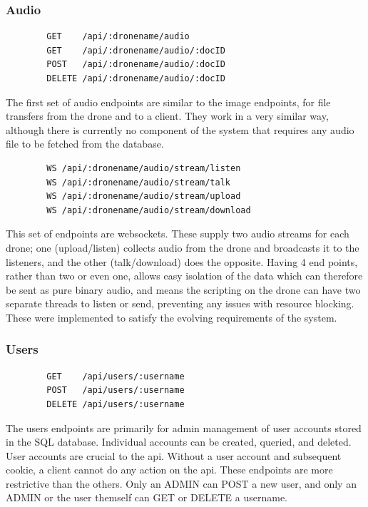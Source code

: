 \documentclass{article}
\begin{document}
\subsubsection{Audio}
\begin{center}
	\begin{lstlisting}
		GET    /api/:dronename/audio
		GET    /api/:dronename/audio/:docID
		POST   /api/:dronename/audio/:docID
		DELETE /api/:dronename/audio/:docID
	\end{lstlisting}
\end{center}
The first set of audio endpoints are similar to the image endpoints, for file transfers from the drone and to a client. They work in a very similar way, although there is currently no component of the system that requires any audio file to be fetched from the database. 
\begin{center}	
	\begin{lstlisting}
		WS /api/:dronename/audio/stream/listen
		WS /api/:dronename/audio/stream/talk
		WS /api/:dronename/audio/stream/upload
		WS /api/:dronename/audio/stream/download
	\end{lstlisting}
\end{center}
This set of endpoints are websockets. These supply two audio streams for each drone; one (upload/listen) collects audio from the drone and broadcasts it to the listeners, and the other (talk/download) does the opposite. Having 4 end points, rather than two or even one, allows easy isolation of the data which can therefore be sent as pure binary audio, and means the scripting on the drone can have two separate threads to listen or send, preventing any issues with resource blocking. These were implemented to satisfy the evolving requirements of the system. 


\subsubsection{Users}
\begin{center}
	\begin{lstlisting}
		GET    /api/users/:username
		POST   /api/users/:username
		DELETE /api/users/:username
	\end{lstlisting}
\end{center}
The users endpoints are primarily for admin management of user accounts stored in the SQL database. Individual accounts can be created, queried, and deleted. User accounts are crucial to the api. Without a user account and subsequent cookie, a client cannot do any action on the api. These endpoints are more restrictive than the others. Only an ADMIN can POST a new user, and only an ADMIN or the user themself can GET or DELETE a username. 
\end{document}
